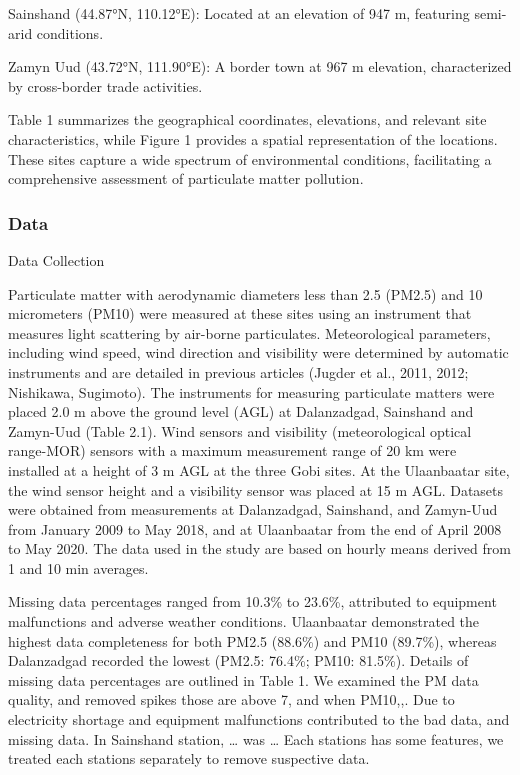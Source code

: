 \documentclass[
  11pt,
]{article}
\begin{document}
Sainshand (44.87°N, 110.12°E): Located at an elevation of 947 m,
featuring semi-arid conditions.

Zamyn Uud (43.72°N, 111.90°E): A border town at 967 m elevation,
characterized by cross-border trade activities.

Table 1 summarizes the geographical coordinates, elevations, and
relevant site characteristics, while Figure 1 provides a spatial
representation of the locations. These sites capture a wide spectrum of
environmental conditions, facilitating a comprehensive assessment of
particulate matter pollution.

\subsubsection{Data}\label{data}

Data Collection

Particulate matter with aerodynamic diameters less than 2.5 (PM2.5) and
10 micrometers (PM10) were measured at these sites using an instrument
that measures light scattering by air-borne particulates. Meteorological
parameters, including wind speed, wind direction and visibility were
determined by automatic instruments and are detailed in previous
articles (Jugder et al., 2011, 2012; Nishikawa, Sugimoto). The
instruments for measuring particulate matters were placed 2.0 m above
the ground level (AGL) at Dalanzadgad, Sainshand and Zamyn-Uud (Table
2.1). Wind sensors and visibility (meteorological optical range-MOR)
sensors with a maximum measurement range of 20 km were installed at a
height of 3 m AGL at the three Gobi sites. At the Ulaanbaatar site, the
wind sensor height and a visibility sensor was placed at 15 m AGL.
Datasets were obtained from measurements at Dalanzadgad, Sainshand, and
Zamyn-Uud from January 2009 to May 2018, and at Ulaanbaatar from the end
of April 2008 to May 2020. The data used in the study are based on
hourly means derived from 1 and 10 min averages.

Missing data percentages ranged from 10.3\% to 23.6\%, attributed to
equipment malfunctions and adverse weather conditions. Ulaanbaatar
demonstrated the highest data completeness for both PM2.5 (88.6\%) and
PM10 (89.7\%), whereas Dalanzadgad recorded the lowest (PM2.5: 76.4\%;
PM10: 81.5\%). Details of missing data percentages are outlined in Table
1. We examined the PM data quality, and removed spikes those are above
7, and when PM10,,. Due to electricity shortage and equipment
malfunctions contributed to the bad data, and missing data. In Sainshand
station, \ldots{} was \ldots{} Each stations has some features, we
treated each stations separately to remove suspective data.
\end{document}
